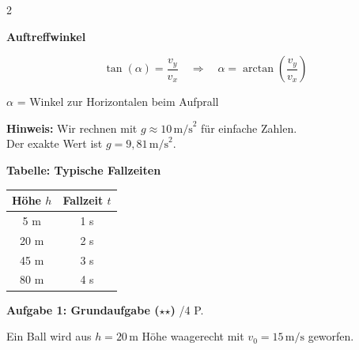\documentclass[10pt, a4paper]{article}
\newcommand{\fachfarbe}{physik}
\newcommand{\stmark}{$\star$}
\newcommand{\abschnitt}[1]{%
    \vspace{8pt}
    \noindent\textbf{\textcolor{\fachfarbe}{#1}}
    \vspace{4pt}
}
\newcommand{\punkte}[1]{\hfill\small\textcolor{grau}{/#1 P.}}
\begin{document}
\begin{multicols}{2}
\begin{formelbox}
\textbf{Auftreffwinkel}
\vspace{2pt}

\begin{equation*}
\tan(\alpha) = \frac{v_y}{v_x} \quad \Rightarrow \quad \alpha = \arctan\left(\frac{v_y}{v_x}\right)
\end{equation*}

\vspace{2pt}
\footnotesize
$\alpha$ = Winkel zur Horizontalen beim Aufprall
\end{formelbox}

\vspace{4pt}

\begin{hinweisbox}
\footnotesize
\textbf{Hinweis:} Wir rechnen mit $g \approx 10\,\text{m/s}^2$ für einfache Zahlen.\\
Der exakte Wert ist $g = 9{,}81\,\text{m/s}^2$.
\end{hinweisbox}


\columnbreak


\abschnitt{Tabelle: Typische Fallzeiten}

\begin{center}
\begin{tabular}{|c|c|}
\hline
\textbf{Höhe $h$} & \textbf{Fallzeit $t$} \\
\hline
5 m & 1 s \\
\hline
20 m & 2 s \\
\hline
45 m & 3 s \\
\hline
80 m & 4 s \\
\hline
\end{tabular}
\end{center}

\vspace{2pt}


\abschnitt{Aufgabe 1: Grundaufgabe (\stmark\stmark)}\punkte{4}

Ein Ball wird aus $h = 20\,\text{m}$ Höhe waagerecht mit $v_0 = 15\,\text{m/s}$ geworfen.


\end{multicols}
\end{document}
